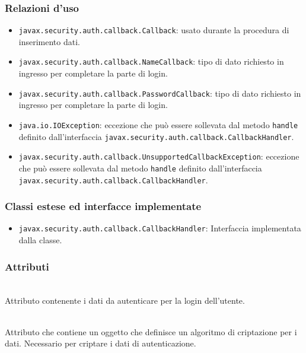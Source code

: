 \subsubsection*{Relazioni d'uso}
\begin{itemize}
	\item \texttt{javax.security.auth.callback.Callback}: usato durante la procedura di inserimento dati.
	\item \texttt{javax.security.auth.callback.NameCallback}: tipo di dato richiesto in ingresso per completare la parte di login.
	\item \texttt{javax.security.auth.callback.PasswordCallback}: tipo di dato richiesto in ingresso per completare la parte di login.
	\item \texttt{java.io.IOException}: eccezione che può essere sollevata dal metodo \texttt{handle} definito dall'interfaccia \texttt{javax.security.auth.callback.CallbackHandler}.
	\item \texttt{javax.security.auth.callback.UnsupportedCallbackException}: eccezione che può essere sollevata dal metodo \texttt{handle} definito dall'interfaccia \texttt{javax.security.auth.callback.CallbackHandler}.
\end{itemize}

\subsubsection*{Classi estese ed interfacce implementate}
\begin{itemize}
	\item \texttt{javax.security.auth.callback.CallbackHandler}: Interfaccia implementata dalla classe.
\end{itemize}

\subsubsection*{Attributi}
\begin{description}
  \item{}\\
  Attributo contenente i dati da autenticare per la login dell'utente.
  \item{}\\
  Attributo che contiene un oggetto che definisce un algoritmo di criptazione per i dati. Necessario per criptare i dati di autenticazione.
\end{description}

